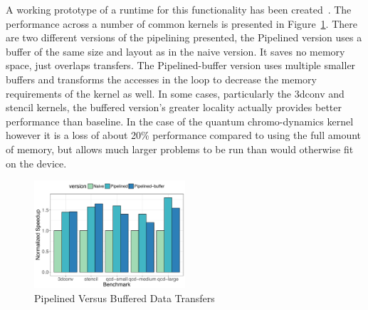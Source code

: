 A working prototype of a runtime for this functionality has been
created~\cite{cui2017directive}. The performance across a number of common
kernels is presented in Figure~\ref{fig:pipeline-perf}.  There are two different
versions of the pipelining presented, the Pipelined version uses a buffer of the
same size and layout as in the naive version.  It saves no memory space, just
overlaps transfers.  The Pipelined-buffer version uses multiple smaller buffers
and transforms the accesses in the loop to decrease the memory requirements of
the kernel as well.  In some cases, particularly the 3dconv and stencil kernels,
the buffered version's greater locality actually provides better performance
than baseline. In the case of the quantum chromo-dynamics kernel however it is a
loss of about 20\% performance compared to using the full amount of memory, but
allows much larger problems to be run than would otherwise fit on the device.

\begin{figure}
  \centering
  \includegraphics[width=0.5\textwidth]{pics/pipelining-perf}
  \caption{Pipelined Versus Buffered Data Transfers\label{fig:pipeline-perf}}
\end{figure}

